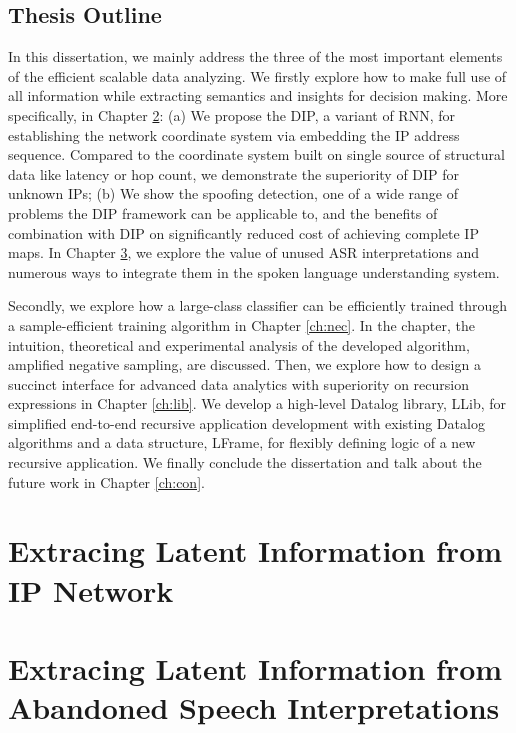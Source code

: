 \documentclass [PhD] {uclathes}
\begin{document}
\section{Thesis Outline}

In this dissertation, we mainly address the three of the most important elements of the efficient scalable data analyzing. We firstly explore how to make full use of all information while extracting semantics and insights for decision making. More specifically, in  Chapter \ref{ch:dip}: (a) We propose the DIP, a variant of RNN, for establishing the network coordinate system via embedding the IP address sequence. Compared to the coordinate system built on single source of structural data like latency or hop count, we demonstrate the superiority of DIP for unknown IPs; (b) We show the spoofing detection, one of a wide range of problems the DIP framework can be applicable to, and the benefits of combination with DIP on   significantly reduced cost of achieving complete IP maps. In Chapter \ref{ch:nbest}, we explore the value of unused ASR interpretations and numerous ways to integrate them in the  spoken language understanding system.   

Secondly, we explore how a 
  large-class classifier can be  efficiently trained through a sample-efficient training algorithm in Chapter \ref{ch:nec}. In the chapter, the intuition, theoretical and experimental analysis of the  developed algorithm, amplified negative sampling, are  discussed.  Then, we explore how to design a succinct interface for advanced data analytics with superiority on recursion expressions in Chapter \ref{ch:lib}. We develop a high-level Datalog library, LLib,  for simplified end-to-end recursive application development with existing Datalog algorithms and a data structure, LFrame, for flexibly defining logic of a new recursive application. We finally conclude the dissertation and talk about the future work in Chapter \ref{ch:con}.
  
  




\chapter{Extracing Latent  Information from IP Network}
\label{ch:dip}



\chapter{Extracing Latent Information from Abandoned Speech Interpretations}
\label{ch:nbest}
\end{document}
